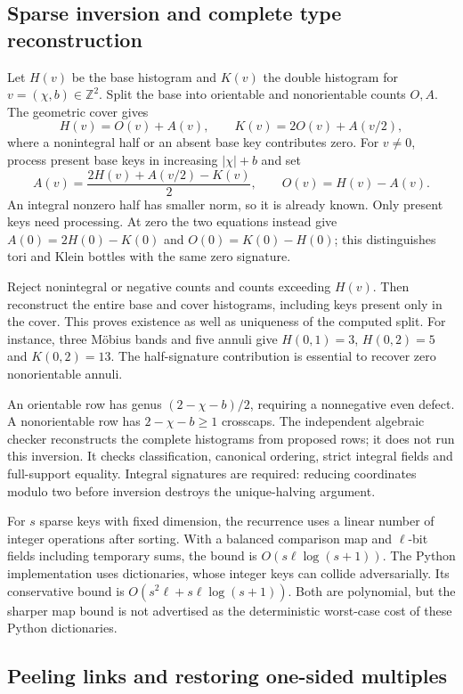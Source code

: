 \subsection{Sparse inversion and complete type reconstruction}

Let $H(v)$ be the base histogram and $K(v)$ the double histogram for
$v=(\chi,b)\in\mathbb Z^2$. Split the base into orientable and nonorientable
counts $O,A$. The geometric cover gives
\[
 H(v)=O(v)+A(v),\qquad K(v)=2O(v)+A(v/2),
\]
where a nonintegral half or an absent base key contributes zero. For $v\ne0$,
process present base keys in increasing $|\chi|+b$ and set
\[
 A(v)=\frac{2H(v)+A(v/2)-K(v)}2,\qquad O(v)=H(v)-A(v).
\]
An integral nonzero half has smaller norm, so it is already known. Only
present keys need processing. At zero the two equations instead give
$A(0)=2H(0)-K(0)$ and $O(0)=K(0)-H(0)$; this distinguishes tori and Klein
bottles with the same zero signature.

Reject nonintegral or negative counts and counts exceeding $H(v)$. Then
reconstruct the entire base and cover histograms, including keys present
only in the cover. This proves existence as well as uniqueness of the
computed split. For instance, three M\"obius bands and five annuli give
$H(0,1)=3$, $H(0,2)=5$ and $K(0,2)=13$. The half-signature contribution
is essential to recover zero nonorientable annuli.

An orientable row has genus $(2-\chi-b)/2$, requiring a nonnegative even
defect. A nonorientable row has $2-\chi-b\ge1$ crosscaps. The independent
algebraic checker reconstructs the complete histograms from proposed rows;
it does not run this inversion. It checks classification, canonical ordering,
strict integral fields and full-support equality. Integral signatures are
required: reducing coordinates modulo two before inversion destroys the
unique-halving argument.

For $s$ sparse keys with fixed dimension, the recurrence uses a linear
number of integer operations after sorting. With a balanced comparison
map and $\ell$-bit fields including temporary sums, the bound is
$O(s\ell\log(s+1))$. The Python implementation uses dictionaries, whose
integer keys can collide adversarially. Its conservative bound is
$O(s^2\ell+s\ell\log(s+1))$. Both are polynomial, but the sharper map
bound is not advertised as the deterministic worst-case cost of these
Python dictionaries.

\subsection{Peeling links and restoring one-sided multiples}

